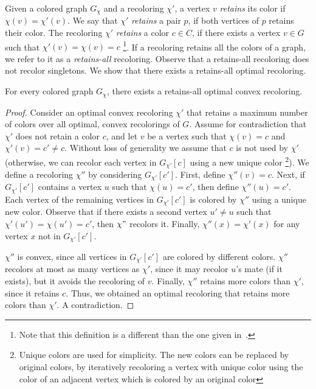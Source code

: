Given a colored graph $G_\chi$ and a recoloring $\chi'$, 
a vertex $v$ \emph{retains} its color if $\chi(v)=\chi'(v)$. 
%
We say that $\chi'$ \emph{retains} a pair $p$, 
if both vertices of $p$ retains their color.  
%
The recoloring $\chi'$ \emph{retains} a color $c \in C$,
if there exists a vertex $v \in G$ such that ${\chi'(v) = \chi(v) = c}$
\footnote{
Note that this definition is a different than the one given in~\cite{kanj2009convex}.
}.
%
If a recoloring retains all the colors of a graph, 
we refer to it as a \emph{retains-all} recoloring.
Observe that a retains-all recoloring does not recolor singletons.
%
We show that there exists a retains-all optimal recoloring.

\begin{lemma}
\label{lm:retains-all}
For every colored graph $G_\chi$, 
there exists a retains-all optimal convex recoloring.
\end{lemma}

\begin{proof}
Consider an optimal convex recoloring $\chi'$ that retains a maximum
number of colors over all optimal, 
convex recolorings of $G$.
%
Assume for contradiction that $\chi'$ does not retain a color $c$, 
and let $v$ be a vertex such that $\chi(v) = c$ and $\chi'(v) = c' \neq c$.
%
Without loss of generality we assume that $c$ is not used by $\chi'$ 
(otherwise, we can recolor each vertex in $G_{\chi'}[c]$ using a new unique color%
\footnote{
Unique colors are used for simplicity. 
The new colors can be replaced by original colors, 
by iteratively recoloring a vertex with unique color 
using the color of an adjacent vertex which is colored by an original color
}).
%
We define a recoloring $\chi''$ by considering $G_{\chi'}[c']$.
%
First, 
define $\chi''(v) = c$.
Next, 
if $G_{\chi'}[c']$ contains a vertex $u$ such that $\chi(u) = c'$, 
then define $\chi''(u) = c'$.
%
Each vertex of the remaining vertices in $G_{\chi'}[c']$ is colored by $\chi''$ 
using a unique new color.
%
Observe that if there exists a second vertex 
$u' \neq u$ such that $\chi'(u') = \chi(u') = c'$, 
then $\chi"$ recolors it.
%
Finally, 
$\chi''(x) = \chi'(x)$ for any vertex $x$ not in $G_{\chi'}[c']$.

$\chi''$ is convex, 
since all vertices in $G_{\chi'}[c']$ are colored by different colors. 
%
$\chi''$ recolors at most as many vertices as $\chi'$, 
since it may recolor $u$'s mate (if it exists), 
but it avoids the recoloring of $v$. 
%
Finally, 
$\chi''$ retains more colors than $\chi'$, 
since it retains $c$.
%
Thus, 
we obtained an optimal recoloring that retains more colors than $\chi'$.  
%
A contradiction.
\end{proof}

